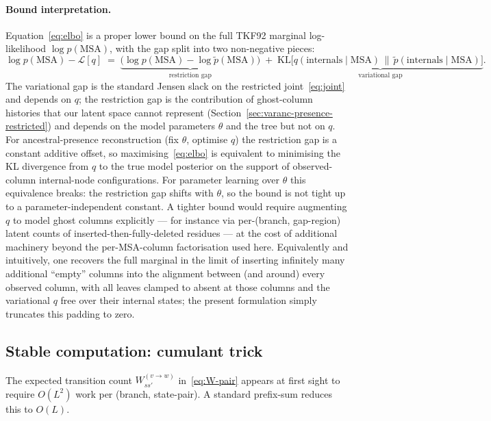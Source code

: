 \paragraph{Bound interpretation.}
Equation~\eqref{eq:elbo} is a proper lower bound on the full TKF92
marginal log-likelihood $\log p(\text{MSA})$, with the gap split into
two non-negative pieces:
\begin{equation}
\label{eq:gap-decomp}
\log p(\text{MSA}) - \mathcal{L}[q]
\;=\;
\underbrace{\big(\log p(\text{MSA}) - \log \tilde{p}(\text{MSA})\big)}_{\text{restriction gap}}
\;+\;
\underbrace{\text{KL}\!\big[q(\text{internals} \mid \text{MSA})\,\|\,\tilde{p}(\text{internals} \mid \text{MSA})\big]}_{\text{variational gap}}.
\end{equation}
The variational gap is the standard Jensen slack on the restricted
joint~\eqref{eq:joint} and depends on $q$;
the restriction gap is the contribution of ghost-column histories
that our latent space cannot represent
(Section~\ref{sec:varanc-presence-restricted}) and depends on the
model parameters $\theta$ and the tree but not on $q$.
For ancestral-presence reconstruction (fix $\theta$, optimise $q$)
the restriction gap is a constant additive offset, so
maximising~\eqref{eq:elbo} is equivalent to minimising the KL
divergence from $q$ to the true model posterior on the support of
observed-column internal-node configurations.
For parameter learning over $\theta$ this equivalence breaks: the
restriction gap shifts with $\theta$, so the bound is not tight up to
a parameter-independent constant.
A tighter bound would require augmenting $q$ to model ghost columns
explicitly — for instance via per-(branch, gap-region) latent counts
of inserted-then-fully-deleted residues — at the cost of additional
machinery beyond the per-MSA-column factorisation used here.
Equivalently and intuitively, one recovers the full marginal in the
limit of inserting infinitely many additional ``empty'' columns into
the alignment between (and around) every observed column, with all
leaves clamped to absent at those columns and the variational $q$
free over their internal states;
the present formulation simply truncates this padding to zero.

\subsection{Stable computation: cumulant trick}
\label{sec:varanc-presence-cumulant}

The expected transition count $W_{s s'}^{(v \to w)}$
in~\eqref{eq:W-pair} appears at first sight to require
$O(L^2)$ work per (branch, state-pair).
A standard prefix-sum reduces this to $O(L)$.

